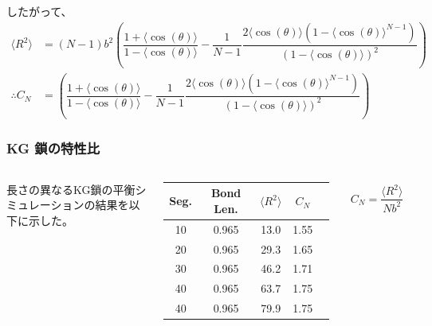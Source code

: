 \documentclass[11pt, dvipdfmx]{beamer}
\begin{document}
\begin{appendix}
\begin{frame}

したがって、
\begin{align*}
\langle R^2 \rangle
&= (N-1) b^2
\left( 
\dfrac{1+ \langle \cos (\theta) \rangle}{1 - \langle \cos (\theta) \rangle}
-\dfrac{1}{N-1}
\dfrac{2 \langle \cos (\theta) \rangle(1-\langle \cos (\theta) \rangle^{N-1})}
{(1-\langle \cos (\theta) \rangle)^2}
\right) \\
\therefore 
C_{N} &= 
\left( 
\dfrac{1+ \langle \cos (\theta) \rangle}{1 - \langle \cos (\theta) \rangle}
-\dfrac{1}{N-1}
\dfrac{2 \langle \cos (\theta) \rangle(1-\langle \cos (\theta) \rangle^{N-1})}
{(1-\langle \cos (\theta) \rangle)^2}
\right)
\end{align*}
\end{frame}

\begin{frame}
\frametitle{KG 鎖の特性比}

\begin{columns}[totalwidth=1\textwidth]
\footnotesize
長さの異なるKG鎖の平衡シミュレーションの結果を以下に示した。

\begin{table}[htb]
 \centering
 \begin{tabular}{c c c c c} \hline
Seg.	& Bond Len.	& $\langle R^2 \rangle$	& $C_{N}$	\\ \hline \hline	
10		& 0.965		& 13.0			& 1.55			\\ \hline	
20		& 0.965		& 29.3			& 1.65			\\ \hline	
30		& 0.965		& 46.2			& 1.71			\\ \hline	
40		& 0.965		& 63.7			& 1.75			\\ \hline	
40		& 0.965		& 79.9			& 1.75			\\ \hline
 \end{tabular}
\end{table}

\vspace{-5mm}
\begin{align*}
C_{N} = \dfrac{\langle R^2 \rangle}{N b^2}
\end{align*}


\end{columns}
\end{frame}
\end{appendix}
\end{document}
